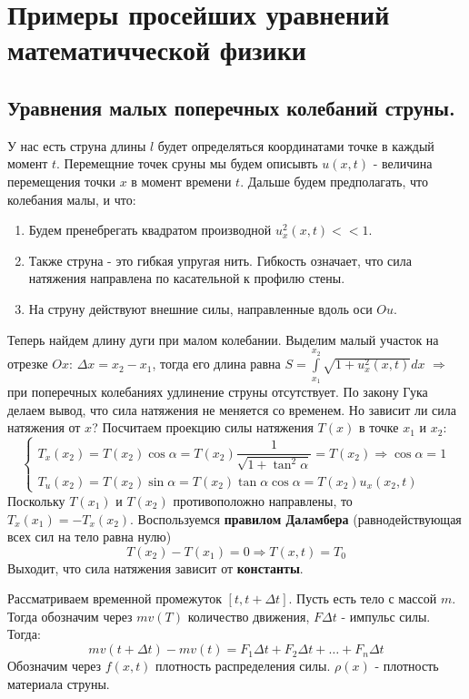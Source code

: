 
\section*{Примеры просейших уравнений математичческой физики}
\subsection*{Уравнения малых поперечных колебаний струны.}
У нас есть струна длины $l$ будет определяться
координатами точке в каждый момент $t$. Перемещние точек сруны мы будем описывть $u(x, t)$ -
величина перемещения точки $x$ в момент времени $t$.
Дальше будем предполагать, что колебания малы, и что:
\begin{enumerate}
    \item Будем пренебрегать квадратом производной $u_x^2 (x, t) << 1$.
    \item Также струна - это гибкая упругая нить. Гибкость означает, что сила натяжения направлена по касательной к профилю стены.
    \item На струну действуют внешние силы, направленные вдоль оси $Ou$.
\end{enumerate}
Теперь найдем длину дуги при малом колебании. Выделим малый участок на отрезке $Ox$: $\Delta x = x_2 - x_1$, тогда его длина равна $S = \int\limits_{x_1}^{x_2} \sqrt{1 + u_x^2(x, t)}dx$ $\Rightarrow$
при поперечных колебаниях удлинение струны отсутствует. По закону Гука делаем вывод, что сила натяжения не меняется со временем.
Но зависит ли сила натяжения от $x$? Посчитаем проекцию силы натяжения $T(x)$ в точке $x_1$ и $x_2$:
$$ \begin{cases}
        T_x(x_2) = T(x_2) \cos \alpha = T(x_2) \dfrac{1}{\sqrt{1 + \tan^2 \alpha}} = T(x_2) \Rightarrow \cos \alpha = 1 \\
        T_u(x_2) = T(x_2) \sin \alpha = T(x_2) \tan \alpha \cos \alpha = T(x_2) u_x(x_2, t)
    \end{cases} $$
Поскольку $T(x_1)$ и $T(x_2)$ противоположно направлены, то $T_x(x_1) = -T_x(x_2)$. Воспользуемся \textbf{правилом Даламбера} (равнодействующая всех сил на тело равна нулю)
$$ T(x_2) - T(x_1) = 0 \Rightarrow T(x, t) = T_0 $$
Выходит, что сила натяжения зависит от \textbf{константы}. \par
Рассматриваем временной промежуток $[t, t + \Delta t]$.
Пусть есть тело с массой $m$. Тогда обозначим через $mv(T)$ количество движения, $F\Delta t$ - импульс силы. Тогда:
$$ m v (t + \Delta t) - m v (t) = F_1 \Delta t + F_2 \Delta t + \ldots + F_n \Delta t $$
Обозначим через $f(x, t)$ плотность распределения силы. $\rho(x)$ - плотность материала струны.
